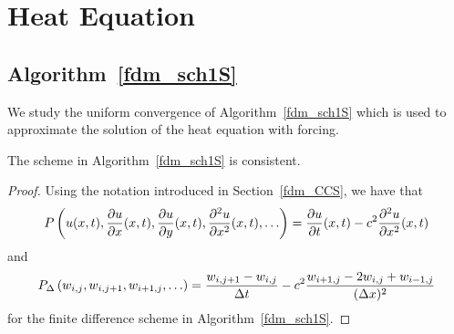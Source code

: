 \section{Heat Equation}

\subsection{Algorithm~\ref{fdm_sch1S}}

We study the uniform convergence of Algorithm~\ref{fdm_sch1S} which is
used to approximate the solution of the heat equation with forcing.

\begin{prop}
The scheme in Algorithm~\ref{fdm_sch1S} is consistent.
\end{prop}

\begin{proof}
Using the notation introduced in Section~\ref{fdm_CCS}, we have that
\[
P\left(u(x,t), \frac{\partial{u}}{\partial{x}}(x,t), \frac{\partial{u}}{\partial{y}}(x,t),
  \frac{\partial^{2}{u}}{\partial{x}^{2}}(x,t), \ldots \right)
= \frac{\partial{u}}{\partial{t}}(x,t) - c^2 \frac{\partial^{2}{u}}{\partial{x}^{2}}(x,t)
\]
and
\[
P_\Delta\left(w_{i,j}, w_{i,j+1}, w_{i+1,j}, \ldots\right)
= \frac{w_{i,j+1} - w_{i,j}}{\Delta{t}} - c^2 \frac{w_{i+1,j} - 2w_{i,j} +
  w_{i-1,j}}{(\Delta{x})^2}
\]
for the finite difference scheme in Algorithm~\ref{fdm_sch1S}.


\end{proof}
